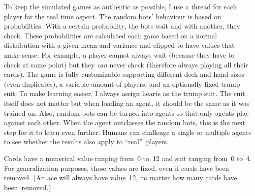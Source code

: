 \documentclass[a4paper,titlepage]{article}
\begin{document}
To keep the simulated games as authentic as possible, I use a thread for each player for the real time aspect. The random bots' behaviour is based on probabilities. With a certain probability, the bots wait and with another, they check. These probabilities are calculated each game based on a normal distribution with a given mean and variance and clipped to have values that make sense. For example, a player cannot always wait (because they have to check at some point) but they \emph{can} never check (therefore always playing all their cards). The game is fully customizable supporting different deck and hand sizes (even duplicates), a variable amount of players, and an optionally fixed trump suit. To make learning easier, I always assign hearts as the trump suit. The suit itself does not matter but when loading an agent, it should be the same as it was trained on. Also, random bots can be turned into agents so that only agents play against each other. When the agent outclasses the random bots, this is the next step for it to learn even further. Humans can challenge a single or multiple agents to see whether the results also apply to ``real''~players.

Cards have a numerical value ranging from~0 to~12 and suit ranging from~0 to~4. For generalization purposes, these values are fixed, even if cards have been removed. (An ace will always have value~12, no matter how many cards have been~removed.) \medskip
\end{document}
